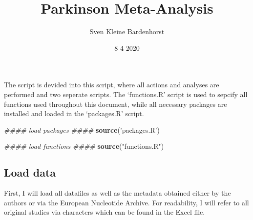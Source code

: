 \documentclass[
]{article}
\title{Parkinson Meta-Analysis}
\author{Sven Kleine Bardenhorst}
\date{8 4 2020}
\newenvironment{Shaded}{\begin{snugshade}}{\end{snugshade}}
\newcommand{\CommentTok}[1]{\textcolor[rgb]{0.56,0.35,0.01}{\textit{#1}}}
\newcommand{\KeywordTok}[1]{\textcolor[rgb]{0.13,0.29,0.53}{\textbf{#1}}}
\newcommand{\NormalTok}[1]{#1}
\newcommand{\StringTok}[1]{\textcolor[rgb]{0.31,0.60,0.02}{#1}}
\begin{document}
\maketitle

The script is devided into this script, where all actions and analyses
are performed and two seperate scripts. The `functions.R' script is used
to sepcify all functions used throughout this document, while all
necessary packages are installed and loaded in the `packages.R' script.

\begin{Shaded}
\begin{Highlighting}[]
\CommentTok{#### load packages ####}
\KeywordTok{source}\NormalTok{(}\StringTok{'packages.R'}\NormalTok{)}

\CommentTok{#### load functions ####}
\KeywordTok{source}\NormalTok{(}\StringTok{"functions.R"}\NormalTok{)}
\end{Highlighting}
\end{Shaded}

\hypertarget{load-data}{%
\subsection{Load data}\label{load-data}}

First, I will load all datafiles as well as the metadata obtained either
by the authors or via the European Nucleotide Archive. For readability,
I will refer to all original studies via characters which can be found
in the Excel file.
\end{document}
